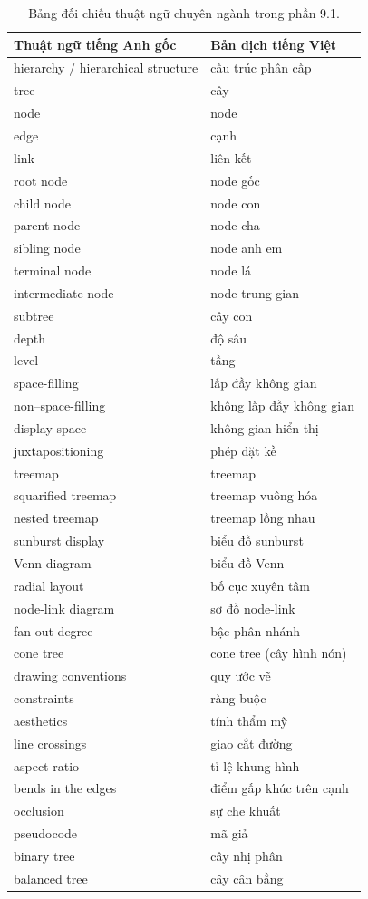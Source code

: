 \documentclass[12pt,a4paper,openany]{book}
\begin{document}
\begin{table}[htbp]
\centering
\small
\begin{tabular}{|p{6.5cm}|p{7.5cm}|}
\hline
\textbf{Thuật ngữ tiếng Anh gốc} & \textbf{Bản dịch tiếng Việt} \\
\hline
hierarchy / hierarchical structure & cấu trúc phân cấp \\
tree & cây \\
node & node \\
edge & cạnh \\
link & liên kết \\
root node & node gốc \\
child node & node con \\
parent node & node cha \\
sibling node & node anh em \\
terminal node & node lá \\
intermediate node & node trung gian \\
subtree & cây con \\
depth & độ sâu \\
level & tầng \\
space-filling & lấp đầy không gian \\
non--space-filling & không lấp đầy không gian \\
display space & không gian hiển thị \\
juxtapositioning & phép đặt kề \\
treemap & treemap \\
squarified treemap & treemap vuông hóa \\
nested treemap & treemap lồng nhau \\
sunburst display & biểu đồ sunburst \\
Venn diagram & biểu đồ Venn \\
radial layout & bố cục xuyên tâm \\
node-link diagram & sơ đồ node-link \\
fan-out degree & bậc phân nhánh \\
cone tree & cone tree (cây hình nón) \\
drawing conventions & quy ước vẽ \\
constraints & ràng buộc \\
aesthetics & tính thẩm mỹ \\
line crossings & giao cắt đường \\
aspect ratio & tỉ lệ khung hình \\
bends in the edges & điểm gấp khúc trên cạnh \\
occlusion & sự che khuất \\
pseudocode & mã giả \\
binary tree & cây nhị phân \\
balanced tree & cây cân bằng \\
\hline
\end{tabular}
\caption{Bảng đối chiếu thuật ngữ chuyên ngành trong phần 9.1.}
\label{tab:glossary_9_1}
\end{table}
\end{document}
